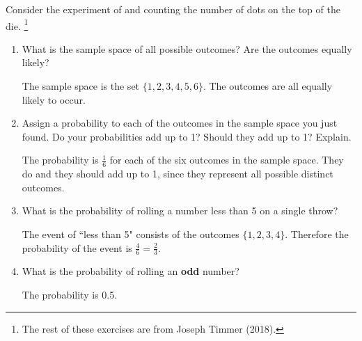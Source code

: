 \documentclass{ccg-topic}
\begin{document}
        \begin{todo}
            Consider the experiment of  and counting the number of dots on the top of the die.%
                \footnote{%
                    The rest of these exercises are from Joseph Timmer (2018).
                }
            
            	\begin{enumerate}
            	\item What is the sample space of all possible outcomes?  Are the outcomes equally likely? 
            
            	{\answer The sample space is the set $\{1, 2, 3, 4, 5, 6\}$.  The outcomes are all equally likely to occur.} 
            
            	\item Assign a probability to each of the outcomes in the sample space you just found.  Do your probabilities add up to 1?  Should they add up to 1?  Explain. 
            
            	{\answer The probability is $\frac{1}{6}$ for each of the six outcomes in the sample space.  They do and they should add up to 1, since they represent all possible distinct outcomes.} 
            
            	\item What is the probability of rolling a number less than 5 on a single throw? 
            
            	{\answer The event of ``less than 5" consists of the outcomes $\{1, 2, 3, 4\}$.  Therefore the probability of the event is $\frac{4}{6}=\frac{2}{3}$.} 
            
                \item What is the probability of rolling an \textbf{odd} number?
            
                {\answer The probability is 0.5.}
            
            	\end{enumerate}
        \end{todo}
	
\end{document}
